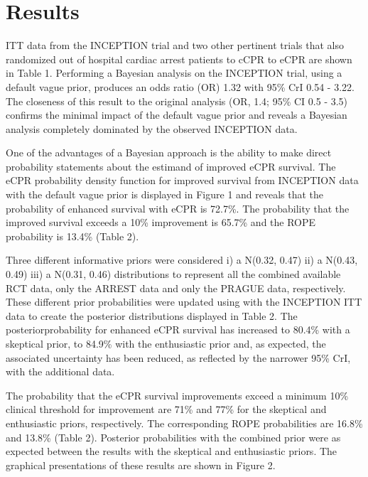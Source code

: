 \documentclass[
  super,
  preprint,
  3p]{elsarticle}
\begin{document}
\hypertarget{results}{%
\section{Results}\label{results}}

ITT data from the INCEPTION trial\citep{CPR2023a} and two other
pertinent trials\citep{RN6759, RN6751} that also randomized out of
hospital cardiac arrest patients to cCPR to eCPR are shown in Table 1.
Performing a Bayesian analysis on the INCEPTION\citep{CPR2023a} trial,
using a default vague prior, produces an odds ratio (OR) 1.32 with 95\%
CrI 0.54 - 3.22. The closeness of this result to the original analysis
(OR, 1.4; 95\% CI 0.5 - 3.5) confirms the minimal impact of the default
vague prior and reveals a Bayesian analysis completely dominated by the
observed INCEPTION\citep{CPR2023a} data.

One of the advantages of a Bayesian approach is the ability to make
direct probability statements about the estimand of improved eCPR
survival. The eCPR probability density function for improved survival
from INCEPTION\citep{CPR2023a} data with the default vague prior is
displayed in Figure 1 and reveals that the probability of enhanced
survival with eCPR is 72.7\%. The probability that the improved survival
exceeds a 10\% improvement is 65.7\% and the ROPE probability is 13.4\%
(Table 2).

Three different informative priors were considered i) a N(0.32, 0.47)
ii) a N(0.43, 0.49) iii) a N(0.31, 0.46) distributions to represent all
the combined available RCT data\citep{RN6759, RN6751}, only the
ARREST\citep{RN6751} data and only the PRAGUE\citep{RN6759} data,
respectively. These different prior probabilities were updated using
with the INCEPTION\citep{CPR2023a} ITT data to create the posterior
distributions displayed in Table 2. The posteriorprobability for
enhanced eCPR survival has increased to 80.4\% with a skeptical prior,
to 84.9\% with the enthusiastic prior and, as expected, the associated
uncertainty has been reduced, as reflected by the narrower 95\% CrI,
with the additional data.

The probability that the eCPR survival improvements exceed a minimum
10\% clinical threshold for improvement are 71\% and 77\% for the
skeptical and enthusiastic priors, respectively. The corresponding ROPE
probabilities are 16.8\% and 13.8\% (Table 2). Posterior probabilities
with the combined prior were as expected between the results with the
skeptical and enthusiastic priors. The graphical presentations of these
results are shown in Figure 2.
\end{document}
